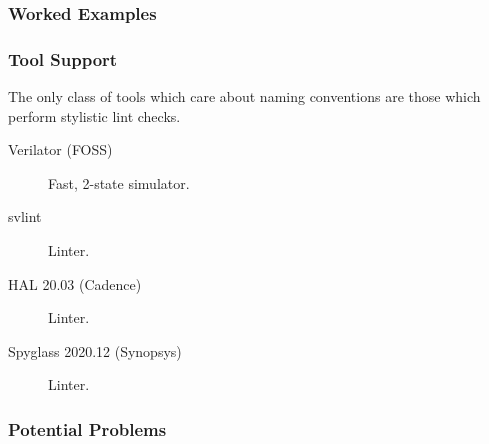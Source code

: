 \documentclass[a4paper]{article}
\begin{document}
\subsubsection{Worked Examples} %
\label{sec:SimpleAlways_workedExamples}


\subsubsection{Tool Support} %
\label{sec:SimpleAlways_toolSupport}
The only class of tools which care about naming conventions are those which
perform stylistic lint checks.

\begin{description}
\item[Verilator (\gls{FOSS})]
  Fast, 2-state simulator.
\item[svlint]
  Linter.
\item[HAL 20.03 (Cadence)]
  Linter.
\item[Spyglass 2020.12 (Synopsys)]
  Linter.
\end{description}


\subsubsection{Potential Problems} %
\label{sec:SimpleAlways_potentialProblems}
\end{document}
